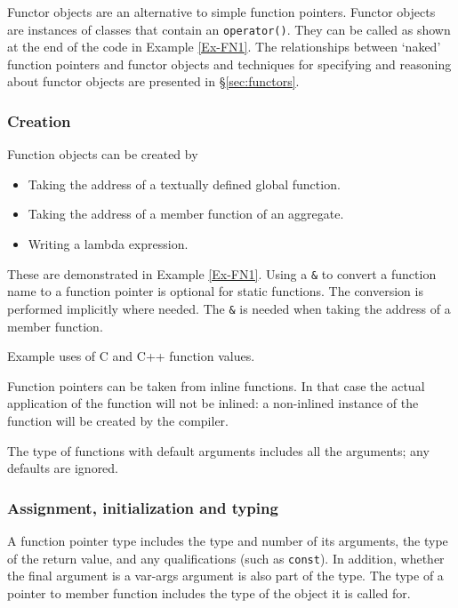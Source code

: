 Functor objects are an alternative to simple function pointers.
Functor objects are instances of classes that contain an
\lstinline|operator()|.
They can be called as shown at the end
of the code in Example \ref{Ex-FN1}.
The relationships between
`naked' function pointers and functor objects and techniques for
specifying and reasoning about functor objects are presented in \S\ref{sec:functors}.

\subsubsection{Creation}

Function objects can be created by
\begin{itemize}[noitemsep,nolistsep]
	\item Taking the address of a textually defined global function.
	\item Taking the address of a member function of an aggregate.
	\item Writing a lambda expression.
\end{itemize}
These are demonstrated in Example \ref{Ex-FN1}.
Using a \lstinline|&| to convert a function name to a function
pointer is optional for static functions. The conversion is performed implicitly where needed. The \lstinline|&| is needed when taking the address
of a member function.
\begin{example}
	 \label{Ex-FN1}
	Example uses of C and C++ function values.
\end{example}

Function pointers can be taken from inline functions. In that case
the actual application of the function will not be inlined: a
non-inlined instance of the function will be created by the compiler.

The type of functions with default arguments includes all the arguments; any defaults are ignored.

\subsubsection{Assignment, initialization and typing}
A function pointer type includes the type and number of its arguments,
the type of the return value, and any qualifications (such as
\lstinline|const|).  In addition, whether the final argument is a
var-args argument is also part of the type.  The type of a pointer to
member function includes the type of the object it is called for.

